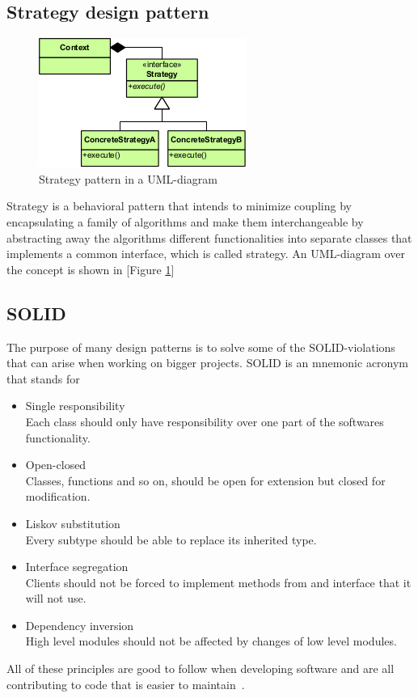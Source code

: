 \documentclass[conference, a4paper]{IEEEtran}
\begin{document}
\subsection{Strategy design pattern}
\label{sec:Strategy}
\begin{figure}[ht!]
	\centering
	\includegraphics[scale=0.7]{Strategy_Pattern_in_UML.png}
	\caption{Strategy pattern in a UML-diagram}
	\label{fig:Strategy}
\end{figure}
Strategy is a behavioral pattern that intends to minimize coupling by encapsulating a family of algorithms and make them interchangeable by abstracting away the algorithms different functionalities into separate classes that implements a common interface, which is called strategy. An UML-diagram over the concept is shown in [Figure \ref{fig:Strategy}]

\subsection{SOLID}
The purpose of many design patterns is to solve some of the SOLID-violations that can arise when working on bigger projects. SOLID is an mnemonic acronym that stands for
\begin{itemize}
    \item Single responsibility \\
    Each class should only have responsibility over one part of the softwares functionality.
    \item Open-closed \\
    Classes, functions and so on, should be open for extension but closed for modification.
    \item Liskov substitution \\
    Every subtype should be able to replace its inherited type.
    \item Interface segregation \\
    Clients should not be forced to implement methods from and interface that it will not use.
    \item Dependency inversion \\
    High level modules should not be affected by changes of low level modules.
\end{itemize}
All of these principles are good to follow when developing software and are all contributing to code that is easier to maintain~\cite{bibitem:Bob}.
\end{document}
